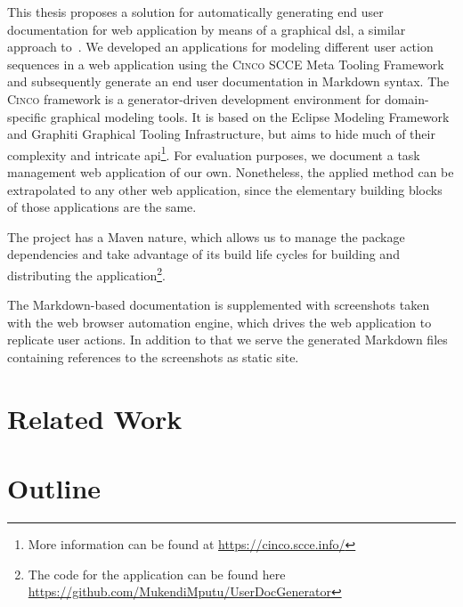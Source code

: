 This thesis proposes a solution for automatically generating end user documentation for web application by means of a graphical \gls*{dsl}, a similar approach to~\cite{bosselmann-et_al}. We developed an applications for modeling different user action sequences in a web application using the \textsc{Cinco} SCCE Meta Tooling Framework~\cite{Cinco} and subsequently generate an end user documentation in Markdown syntax. The \textsc{Cinco} framework is a generator-driven development environment for domain-specific graphical modeling tools. It is based on the Eclipse Modeling Framework and Graphiti Graphical Tooling Infrastructure, but aims to hide much of their complexity and intricate \gls{api}\footnote{More information can be found at \url{https://cinco.scce.info/}}. For evaluation purposes, we document a task management web application of our own. Nonetheless, the applied method can be extrapolated to any other web application, since the elementary building blocks of those applications are the same.

The project has a Maven nature, which allows us to manage the package dependencies and take advantage of its build life cycles for building and distributing the application\footnote{The code for the application can be found here \url{https://github.com/MukendiMputu/UserDocGenerator}}.

The Markdown-based documentation is supplemented with screenshots taken with the web browser automation engine, which drives the web application to replicate user actions. In addition to that we serve the generated Markdown files containing references to the screenshots as static site.

\section{Related Work}\label{sec:relWork}



\section{Outline}\label{sec:outline}

